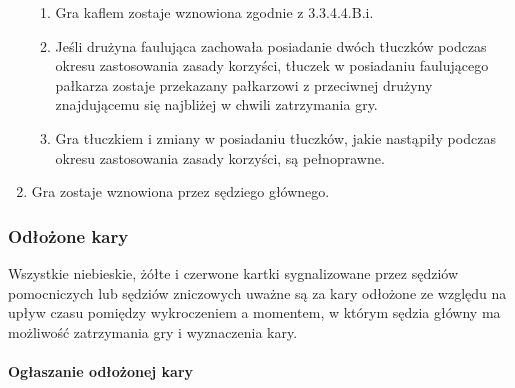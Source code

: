 \documentclass[12pt]{article}
\begin{document}
\begin{enumerate}
  \begin{enumerate}
  \item
        Gra kaflem zostaje wznowiona zgodnie z 3.3.4.4.B.i.
      \item
        Jeśli drużyna faulująca zachowała posiadanie dwóch tłuczków podczas
    okresu zastosowania zasady korzyści, tłuczek w posiadaniu
    faulującego pałkarza zostaje przekazany pałkarzowi z przeciwnej
    drużyny znajdującemu się najbliżej w chwili zatrzymania gry.
      \item
        Gra tłuczkiem i zmiany w posiadaniu tłuczków, jakie nastąpiły
    podczas okresu zastosowania zasady korzyści, są pełnoprawne.
      \end{enumerate}
\item
    Gra zostaje wznowiona przez sędziego głównego.
  \end{enumerate}

\subsubsection{Odłożone kary}

Wszystkie niebieskie, żółte i czerwone kartki sygnalizowane przez
sędziów pomocniczych lub sędziów zniczowych uważne są za kary odłożone
ze względu na upływ czasu pomiędzy wykroczeniem a momentem, w którym
sędzia główny ma możliwość zatrzymania gry i wyznaczenia kary.

\paragraph{Ogłaszanie odłożonej kary}
\end{document}
